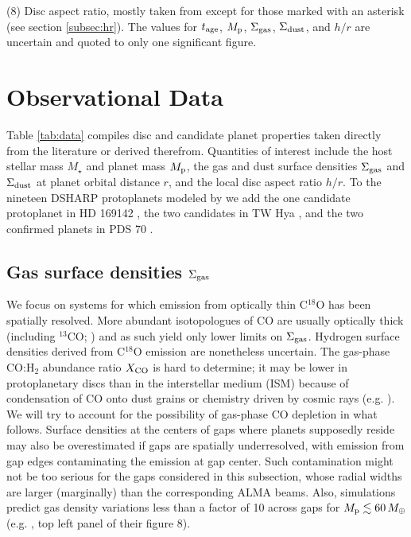 \documentclass[fleqn,usenatbib]{mnras}
\newcommand{\Sigg}{\Sigma_{\rm gas}}
\newcommand{\Sigd}{\Sigma_{\rm dust}}
\begin{document}
\begin{table*}
{(8) Disc aspect ratio, mostly taken from \protect\citet{zhang_etal_2018} except for those marked with an asterisk (see section \ref{subsec:hr}).
The values for $t_{\rm age}$, $M_{\rm p}$, $\Sigg$, $\Sigd$, and $h/r$ are uncertain and quoted to only one significant figure.}
  \label{tab:data}
\end{table*}



\section{Observational Data}
\label{sec:data}
Table \ref{tab:data} compiles disc and candidate planet properties taken directly from the literature or derived therefrom. Quantities of interest include the host stellar mass $M_\star$ and planet mass $M_{\rm p}$,
the gas and dust surface densities $\Sigg$ and $\Sigd$ at planet orbital distance $r$, and the local disc aspect ratio $h/r$. To the nineteen DSHARP protoplanets modeled by \cite{zhang_etal_2018} we add the one candidate protoplanet in HD 169142 \citep{dong_fung_2017}, the two candidates in TW Hya \citep{dong_fung_2017}, and the two confirmed planets in PDS 70 \citep{keppler_etal_2018, haffert_etal_2019}.


\subsection{Gas surface densities $\Sigg$}
\label{subsec:gsd}
We focus on systems for which emission from optically thin C$^{18}$O has been spatially resolved. More abundant isotopologues of CO are usually optically thick (including $^{13}$CO; \citealt{vdm_etal_2015, favre_etal_2019}) and as such yield only lower limits on $\Sigg$. Hydrogen surface densities derived from C$^{18}$O emission are nonetheless uncertain. The gas-phase CO:H$_2$ abundance ratio $X_{\rm CO}$ is hard to determine; it may be lower in protoplanetary discs than in the interstellar medium (ISM) because of condensation of CO onto dust grains or 
chemistry driven by cosmic rays
(e.g. \citealt{schwarz_etal_2018}).
We will try to account for the possibility of gas-phase CO depletion in what follows. 
Surface densities at the centers of
gaps where planets supposedly reside
may also be overestimated if gaps are spatially underresolved, with emission from gap edges contaminating the emission at gap center. Such contamination might not be too serious for the gaps considered in this subsection, whose radial widths are larger (marginally) than the corresponding ALMA beams. Also, simulations predict gas density variations less than a factor of 10 across gaps for $M_{\rm p} \lesssim 60 \, M_\oplus$ (e.g. \citealt{dong_etal_2017}, top left panel of their figure 8).   
\end{document}
